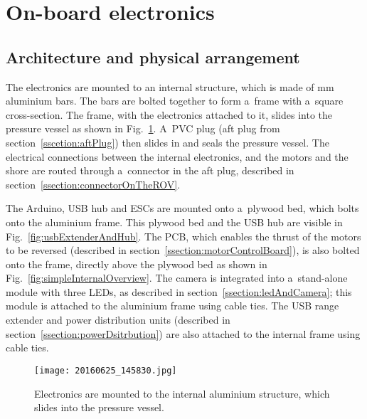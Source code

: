 \clearpage %

\section{On-board electronics}\label{section:electronics}

\subsection{Architecture and physical arrangement}
The electronics are mounted to an internal structure, which is made of \unit[4 by 4]{mm} aluminium bars. The bars are bolted together to form a~frame with a~square cross-section. The frame, with the electronics attached to it, slides into the pressure vessel as shown in Fig.~\ref{fig:electronicsSlideIn}. A~PVC plug (aft plug from section~\ref{sscetion:aftPlug}) then slides in and seals the pressure vessel. The electrical connections between the internal electronics, and the motors and the shore are routed through a~connector in the aft plug, described in section~\ref{ssection:connectorOnTheROV}.

The Arduino, USB hub and ESCs are mounted onto a~plywood bed, which bolts onto the aluminium frame. This plywood bed and the USB hub are visible in Fig.~\ref{fig:usbExtenderAndHub}. The PCB, which enables the thrust of the motors to be reversed (described in section~\ref{ssection:motorControlBoard}), is also bolted onto the frame, directly above the plywood bed as shown in Fig.~\ref{fig:simpleInternalOverview}. The camera is integrated into a~stand-alone module with three LEDs, as described in section~\ref{ssection:ledAndCamera}; this module is attached to the aluminium frame using cable ties. The USB range extender and power distribution units (described in section~\ref{ssection:powerDsitrbution}) are also attached to the internal frame using cable ties.

\begin{figure}[htb]
\begin{minipage}[b]{1\linewidth}
  \centering
	\texttt{[image: 20160625\_145830.jpg]}
\end{minipage}
\caption{Electronics are mounted to the internal aluminium structure, which slides into the pressure vessel.}
\label{fig:electronicsSlideIn}
\end{figure}


